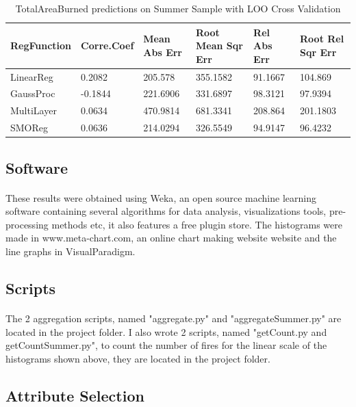 \documentclass[runningheads]{llncs}
\begin{document}
\begin{table}[H]
\caption{TotalAreaBurned  predictions on Summer Sample with LOO Cross Validation}\label{tab12}
\begin{tabular}{|l|l|l|l|l|l|}
\hline
RegFunction & Corre.\break Coef & Mean Abs Err & Root Mean Sqr Err & Rel Abs Err &Root Rel Sqr Err\\
\hline
LinearReg & 0.2082 & 205.578 & 355.1582 & 91.1667 & 104.869  \\
GaussProc & -0.1844 & 221.6906 & 331.6897 & 98.3121 & 97.9394 \\
MultiLayer & 0.0634  & 470.9814 & 681.3341 & 208.864 & 201.1803 \\
SMOReg & 0.0636 & 214.0294 & 326.5549 & 94.9147 & 96.4232 \\
\hline
\end{tabular}
\end{table}



\subsection{Software}
\paragraph{}
These results were obtained using Weka\cite{weka}, an open source machine learning software containing several algorithms for data analysis, visualizations tools, pre-processing methods etc, it also features a free plugin store.
The histograms were made in www.meta-chart.com\cite{meta}, an online chart making website website and the line graphs in VisualParadigm\cite{vp}.


\subsection{Scripts}
\paragraph{}

The 2 aggregation scripts, named "aggregate.py" and "aggregateSummer.py" are located in the project folder.
I also wrote 2 scripts, named "getCount.py and getCountSummer.py", to count the number of fires for the linear scale of the histograms shown above, they are located in the project folder. 

\subsection{Attribute Selection}
\end{document}
